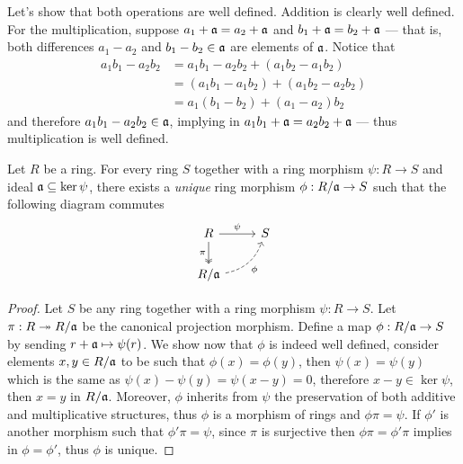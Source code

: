 Let's show that both operations are well defined. Addition is clearly well
defined. For the multiplication, suppose \(a_1 + \mathfrak{a} = a_2 + \mathfrak{a}\)
and \(b_1 + \mathfrak{a} = b_2 + \mathfrak{a}\) --- that is, both differences
\(a_1 - a_2\) and \(b_1 - b_2 \in \mathfrak{a}\) are elements of
\(\mathfrak{a}\). Notice that
\begin{align*}
a_1 b_1 - a_2 b_2
&= a_1 b_1 - a_2 b_2 + (a_1 b_2 - a_1 b_2) \\
&= (a_1 b_1 - a_1 b_2) + (a_1 b_2 - a_2 b_2) \\
&= a_1 (b_1 - b_2) + (a_1 - a_2) b_2
\end{align*}
and therefore \(a_1 b_1 - a_2 b_2 \in \mathfrak{a}\), implying in
\(a_1 b_1 + \mathfrak{a} = a_2 b_2 + \mathfrak{a}\) --- thus multiplication is well
defined.

\begin{proposition}
\label{prop:universal-property-quotienting-rings}
Let \(R\) be a ring. For every ring \(S\) together with a ring morphism \(\psi:
R \to S\) and ideal \(\mathfrak{a} \subseteq \ker \psi\), there exists a
\emph{unique} ring morphism \(\phi: R/\mathfrak{a} \to S\) such that the
following diagram commutes
\[
\begin{tikzcd}
R \ar[r, "\psi"] \ar[d, swap, "\pi", two heads] &S \\
R/\ideal{a} \ar[ru, bend right, swap, "\phi", dashed] &
\end{tikzcd}
\]
\end{proposition}

\begin{proof}
Let \(S\) be any ring together with a ring morphism \(\psi: R \to S\). Let
\(\pi: R \twoheadrightarrow R/\mathfrak{a}\) be the canonical projection morphism. Define a map
\(\phi: R/\mathfrak{a} \to S\) by sending \(r + \mathfrak{a} \mapsto \psi(r)\). We
show now that \(\phi\) is indeed well defined, consider elements
\(x, y \in R/\mathfrak{a}\) to be such that \(\phi(x) = \phi(y)\), then
\(\psi(x) = \psi(y)\) which is the same as
\(\psi(x) - \psi(y) = \psi(x - y) = 0\), therefore \(x - y \in \ker \psi\), then
\(x = y\) in \(R/\mathfrak{a}\). Moreover, \(\phi\) inherits from \(\psi\) the
preservation of both additive and multiplicative structures, thus \(\phi\) is a
morphism of rings and \(\phi \pi = \psi\). If \(\phi'\) is another morphism such
that \(\phi' \pi = \psi\), since \(\pi\) is surjective then \(\phi \pi = \phi'
\pi\) implies in \(\phi = \phi'\), thus \(\phi\) is unique.
\end{proof}

